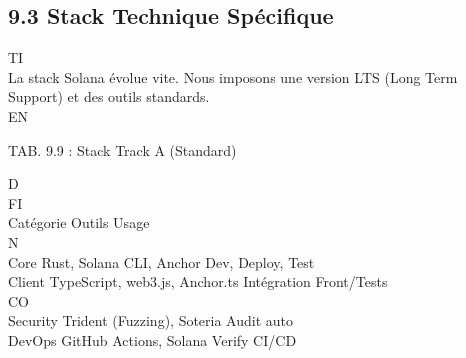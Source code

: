 \documentclass[12pt,landscape,a4paper]{article}
\begin{document}
\subsection{9.3 Stack Technique Spécifique}
\vspace{0.5em}
\vspace{0.5em}
\vspace{0.5em}
\vspace{0.5em}
TI\\
La stack Solana évolue vite. Nous imposons une version LTS (Long Term Support) et des outils standards.\\
\vspace{0.5em}
\vspace{0.5em}
\vspace{0.5em}
\vspace{0.5em}
EN\\
\begin{center}\begin{tabular}TAB. 9.9 : Stack Track A (Standard)\end{tabular}\end{center}
\vspace{0.5em}
\vspace{0.5em}
\vspace{0.5em}
\vspace{0.5em}
D\\
FI\\
Catégorie Outils                         Usage\\
\vspace{0.5em}
\vspace{0.5em}
N\\
Core      Rust, Solana CLI, Anchor       Dev, Deploy, Test\\
Client    TypeScript, web3.js, Anchor.ts Intégration Front/Tests\\
CO\\
Security  Trident (Fuzzing), Soteria     Audit auto\\
DevOps    GitHub Actions, Solana Verify CI/CD\\
\vspace{0.5em}
\vspace{0.5em}
\vspace{0.5em}
\vspace{0.5em}
\end{document}

